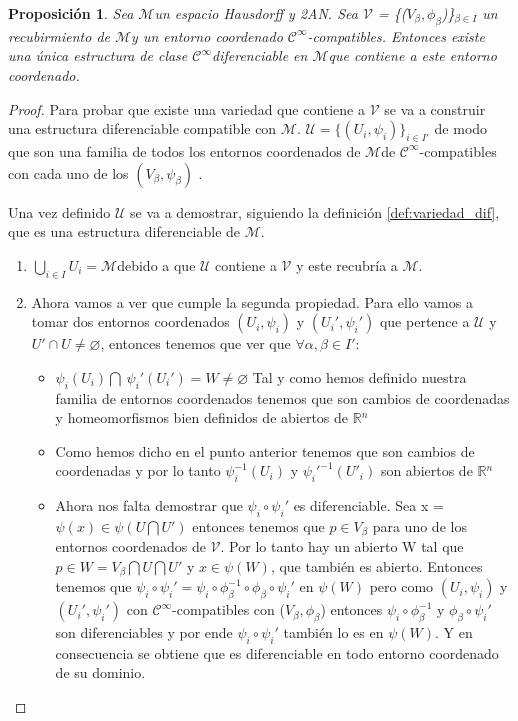 \documentclass[pdftex,11pt,a4paper]{book}
\newtheorem{propo}{Proposición}
\newcommand{\M}{$\mathscr{M}$}
\newcommand{\Cinf}{ $\mathscr{C}^\infty$}
\newcommand{\R}{$\mathbb{R}$}
\renewcommand{\emptyset}{\varnothing}
\begin{document}
\begin{propo} Sea \M un espacio Hausdorff y 2AN. Sea $\mathscr{V}$ = \{($V_\beta, \phi_\beta $)\}$_{\beta \in I}$ un recubirmiento de \M y un entorno coordenado \Cinf -compatibles. Entonces existe una única estructura de clase \Cinf diferenciable en \M que contiene a este entorno coordenado.
\end{propo}

\begin{proof}

Para probar que existe una variedad que contiene a $\mathscr{V}$ se va a construir una estructura diferenciable compatible con \M. $\mathscr{U}=\{(U_i, \psi_i)\}_{i \in I'}$ de modo que son una familia de todos los entornos coordenados de \M  de \Cinf-compatibles con cada uno de los $(V_\beta, \psi_\beta)$ .

Una vez definido $\mathscr{U}$ se va a demostrar, siguiendo la definición \ref{def:variedad_dif}, que es una estructura diferenciable de \M. 
\begin{enumerate}
\item $\bigcup_{i \in I}U_i=$\M debido a que $\mathscr{U}$ contiene a  $\mathscr{V}$ y este recubría a \M.
\item Ahora vamos a ver que cumple la segunda propiedad. Para ello vamos a tomar dos entornos coordenados $(U_i, \psi_i)$ y $(U_i', \psi_i') $ que pertence a $\mathscr{U}$ y $U' \cap U \neq \emptyset$, entonces tenemos que ver que $\forall \alpha, \beta \in I'$: 
	\begin{itemize}
		\item $ \psi_i(U_i) \bigcap \ \psi_i'(U_i') = W \neq \emptyset$ Tal y como hemos definido nuestra familia de entornos coordenados tenemos que son cambios de coordenadas y homeomorfismos bien definidos de abiertos de \R$^n$
		\item Como hemos dicho en el punto anterior tenemos que son cambios de coordenadas y por lo tanto $\psi_i^{-1}(U_i)$ y $\psi_i'^{-1}(U'_i)$ son abiertos de \R$^n$
		
		\item Ahora nos falta demostrar que $\psi_i \circ \psi_i' $ es diferenciable. Sea x = $\psi(x)\in \psi(U \bigcap U')$ entonces tenemos que $p\in V_\beta$ para uno de los entornos coordenados de $\mathscr{V}$. Por lo tanto hay un abierto W tal que $p \in W =V_\beta \bigcap U \bigcap U'$ y $x \in \psi(W)$, que también es abierto. Entonces tenemos que $\psi_i \circ \psi_i'= \psi_i \circ \phi^{-1}_\beta \circ \phi_\beta \circ \psi_i'  $ en $\psi(W)$ pero como $(U_i, \psi_i)$ y $(U_i', \psi_i') $ con \Cinf -compatibles con ($V_\beta, \phi_\beta $) entonces $ \psi_i \circ \phi^{-1}_\beta$ y $ \phi_\beta \circ \psi_i'$ son diferenciables  y por ende $\psi_i \circ \psi_i'$ también lo es en $\psi(W)$. Y en consecuencia se obtiene que es diferenciable en todo entorno coordenado de su dominio. 
	\end{itemize}
	

\end{enumerate}
\end{proof}
\end{document}
